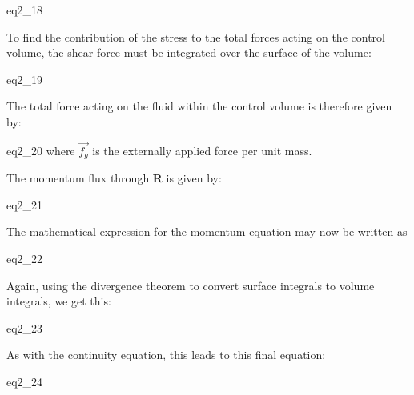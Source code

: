 {eq2_18}

To find the contribution of the stress to the total forces acting on the
control volume, the shear force must be integrated over the surface of the
volume:

{eq2_19}

The total force acting on the fluid within the control volume is therefore given by:

{eq2_20}
where $\overrightarrow{f_g}$ is the externally applied force per unit mass.

The momentum flux through {\bf R} is given by:

{eq2_21}

The mathematical expression for the momentum equation may now be written as

{eq2_22}


Again, using the divergence theorem to convert surface integrals to volume
integrals, we get this:

{eq2_23}

As with the continuity equation, this leads to this final equation:

{eq2_24}


